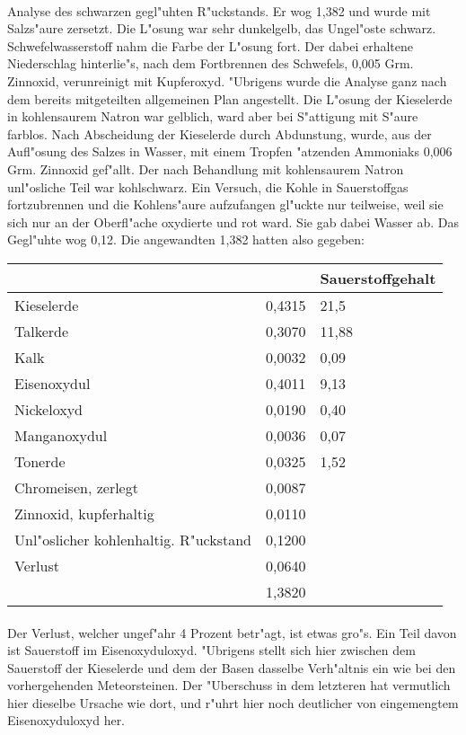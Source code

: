\documentclass[a4paper, 11pt, oneside]{article}
\begin{document}
\paragraph{}
Analyse des schwarzen gegl"uhten R"uckstands. Er wog 1,382 und wurde mit Salzs"aure zersetzt. Die L"osung war sehr dunkelgelb, das Ungel"oste schwarz. Schwefelwasserstoff nahm die Farbe der L"osung fort. Der dabei erhaltene Niederschlag hinterlie"s, nach dem Fortbrennen des Schwefels, 0,005 Grm. Zinnoxid, verunreinigt mit Kupferoxyd. "Ubrigens wurde die Analyse ganz nach dem bereits mitgeteilten allgemeinen Plan angestellt. Die L"osung der Kieselerde in kohlensaurem Natron war gelblich, ward aber bei S"attigung mit S"aure farblos. Nach Abscheidung der Kieselerde durch Abdunstung, wurde, aus der Aufl"osung des Salzes in Wasser, mit einem Tropfen "atzenden Ammoniaks 0,006 Grm. Zinnoxid gef"allt. Der nach Behandlung mit kohlensaurem Natron unl"osliche Teil war kohlschwarz. Ein Versuch, die Kohle in Sauerstoffgas fortzubrennen und die Kohlens"aure aufzufangen gl"uckte nur teilweise, weil sie sich nur an der Oberfl"ache oxydierte und rot ward. Sie gab dabei Wasser ab. Das Gegl"uhte wog 0,12. Die angewandten 1,382 hatten also gegeben:
\begin{center}
\begin{tabular}{ |p{35mm}|p{20mm}|p{30mm}| }
    \hline
     &  & Sauerstoffgehalt\\\hline
    Kieselerde & 0,4315 & 21,5\\\hline
    Talkerde & 0,3070 & 11,88\\\hline
    Kalk & 0,0032 & 0,09\\\hline
    Eisenoxydul & 0,4011 & 9,13\\\hline
    Nickeloxyd & 0,0190 & 0,40\\\hline
    Manganoxydul & 0,0036 & 0,07\\\hline
    Tonerde & 0,0325 & 1,52\\\hline
    Chromeisen, zerlegt & 0,0087 & \\\hline
    Zinnoxid, kupferhaltig & 0,0110 & \\\hline
    Unl"oslicher kohlenhaltig. R"uckstand & 0,1200 & \\\hline
    Verlust & 0,0640 & \\\hline
     & 1,3820 & \\
    \hline
\end{tabular}
\end{center}
\paragraph{}
Der Verlust, welcher ungef"ahr 4 Prozent betr"agt, ist etwas gro"s. Ein Teil davon ist Sauerstoff im Eisenoxyduloxyd. "Ubrigens stellt sich hier zwischen dem Sauerstoff der Kieselerde und dem der Basen dasselbe Verh"altnis ein wie bei den vorhergehenden Meteorsteinen. Der "Uberschuss in dem letzteren hat vermutlich hier dieselbe Ursache wie dort, und r"uhrt hier noch deutlicher von eingemengtem Eisenoxyduloxyd her.
\end{document}
